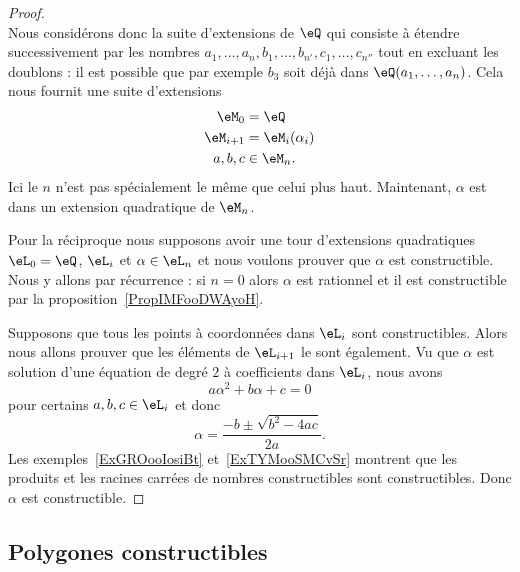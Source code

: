 \begin{proof}
\begin{equation}
	\end{equation}
	Nous considérons donc la suite d'extensions de \( \eQ\) qui consiste à étendre successivement par les nombres \( a_1,\ldots, a_n,b_1,\ldots, b_{n'},c_1,\ldots, c_{n''}\) tout en excluant les doublons : il est possible que par exemple \( b_3\) soit déjà dans \( \eQ(a_1,\ldots, a_n)\). Cela nous fournit une suite d'extensions
	\begin{equation}
		\begin{aligned}[]
			\eM_0     & =\eQ             \\
			\eM_{i+1} & =\eM_i(\alpha_i) \\
			a,b,c     & \in \eM_n.
		\end{aligned}
	\end{equation}
	Ici le \( n\) n'est pas spécialement le même que celui plus haut. Maintenant, \( \alpha\) est dans un extension quadratique de \( \eM_n\).

	Pour la réciproque nous supposons avoir une tour d'extensions quadratiques \( \eL_0=\eQ\), \( \eL_i\) et \( \alpha\in \eL_n\) et nous voulons prouver que \( \alpha\) est constructible. Nous y allons par récurrence : si \( n=0\) alors \( \alpha\) est rationnel et il est constructible par la proposition~\ref{PropIMFooDWAyoH}.

	Supposons que tous les points à coordonnées dans \( \eL_i\) sont constructibles. Alors nous allons prouver que les éléments de \( \eL_{i+1}\) le sont également. Vu que \( \alpha\) est solution d'une équation de degré \( 2\) à coefficients dans \( \eL_i\), nous avons
	\begin{equation}
		a\alpha^2+b\alpha+c=0
	\end{equation}
	pour certains \( a,b,c\in\eL_i\) et donc
	\begin{equation}
		\alpha=\frac{-b\pm\sqrt{b^2-4ac} }{ 2a }.
	\end{equation}
	Les exemples~\ref{ExGROooIosiBt} et~\ref{ExTYMooSMCvSr} montrent que les produits et les racines carrées de nombres constructibles sont constructibles. Donc \( \alpha\) est constructible.
\end{proof}

\subsection{Polygones constructibles}


